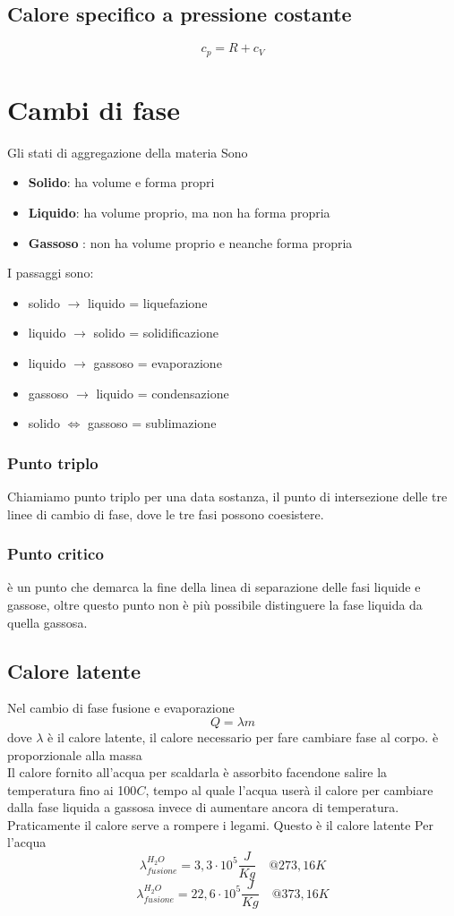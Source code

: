 \documentclass[a4paper]{report}
\begin{document}
  \subsection{Calore specifico a pressione costante}
  $$ c_p = R + c_V $$

  \section{Cambi di fase}
  Gli stati di aggregazione della materia Sono
  \begin{itemize}
    \item \textbf{Solido}: ha volume e forma propri
    \item \textbf{Liquido}: ha volume proprio, ma non ha forma propria
    \item \textbf{Gassoso} : non ha volume proprio e neanche forma propria
  \end{itemize}
  I passaggi sono:
  \begin{itemize}
    \item solido $\rightarrow$ liquido = liquefazione
    \item liquido $\rightarrow$ solido = solidificazione
    \item liquido $\rightarrow$ gassoso = evaporazione
    \item gassoso $\rightarrow$ liquido = condensazione
    \item solido $\iff$ gassoso = sublimazione
  \end{itemize}
  \subsubsection{Punto triplo}
  Chiamiamo punto triplo per una data sostanza, il punto di intersezione delle tre linee di cambio di fase, dove le tre fasi possono coesistere.
  \subsubsection{Punto critico}
  è un punto che demarca la fine della linea di separazione delle fasi liquide e gassose, oltre questo punto non è più possibile distinguere la fase liquida da quella gassosa.
  \subsection{Calore latente}
  Nel cambio di fase fusione e evaporazione
  $$ Q = \lambda m$$
  dove $\lambda$ è il calore latente, il calore necessario per fare cambiare fase al corpo. è proporzionale alla massa\\
  Il calore fornito all'acqua per scaldarla è assorbito facendone salire la temperatura fino ai 100$C$, tempo al quale l'acqua userà il calore per cambiare dalla fase liquida a gassosa invece di aumentare ancora di temperatura. Praticamente il calore serve a rompere i legami. Questo è il calore latente
  Per l'acqua
  $$ \lambda_{fusione}^{H_2O} = 3,3 \cdot 10^5 \frac{J}{Kg} \quad @ 273,16 K $$
  $$ \lambda_{fusione}^{H_2O} = 22,6 \cdot 10^5 \frac{J}{Kg} \quad @ 373,16K $$
\end{document}
